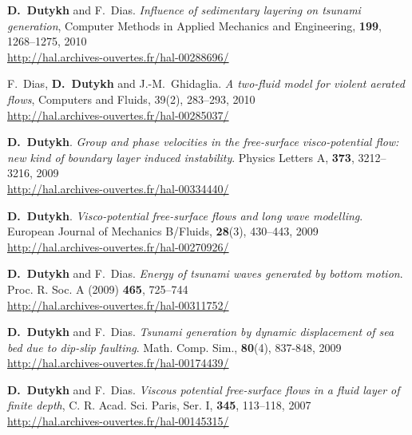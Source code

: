 \begin{etaremune}
  \item \textbf{D.~Dutykh} and F.~Dias. \textit{Influence of sedimentary layering on tsunami generation}, Computer Methods in Applied Mechanics and Engineering, \textbf{199}, 1268--1275, 2010 \\ %
  \url{http://hal.archives-ouvertes.fr/hal-00288696/}
  
  \item F.~Dias, \textbf{D.~Dutykh} and J.-M.~Ghidaglia. \textit{A two-fluid model for violent aerated flows}, Computers and Fluids, 39(2), 283--293, 2010 \\ %
  \url{http://hal.archives-ouvertes.fr/hal-00285037/}
  
  
  \item \textbf{D.~Dutykh}. \textit{Group and phase velocities in the free-surface visco-potential flow: new kind of boundary layer induced instability}. Physics Letters A, \textbf{373}, 3212--3216, 2009 \\ %
  \url{http://hal.archives-ouvertes.fr/hal-00334440/}
  
  \item \textbf{D.~Dutykh}. \textit{Visco-potential free-surface flows and long wave modelling}. European Journal of Mechanics B/Fluids, \textbf{28}(3), 430--443, 2009 \\ %
  \url{http://hal.archives-ouvertes.fr/hal-00270926/}
  
  \item \textbf{D.~Dutykh} and F.~Dias. \textit{Energy of tsunami waves generated by bottom motion}. Proc. R. Soc. A (2009) \textbf{465}, 725--744 \\ %
  \url{http://hal.archives-ouvertes.fr/hal-00311752/}
  
  \item \textbf{D.~Dutykh} and F.~Dias. \textit{Tsunami generation by dynamic displacement of sea bed due to dip-slip faulting}. Math. Comp. Sim., \textbf{80}(4), 837-848, 2009 \\ %
  \url{http://hal.archives-ouvertes.fr/hal-00174439/}
  
  

  
  
  \item \textbf{D.~Dutykh} and F.~Dias. \textit{Viscous potential free-surface flows in a fluid layer of finite depth}, C. R. Acad. Sci. Paris, Ser. I, \textbf{345}, 113--118, 2007 \\ %
  \url{http://hal.archives-ouvertes.fr/hal-00145315/}
  

\end{etaremune}
